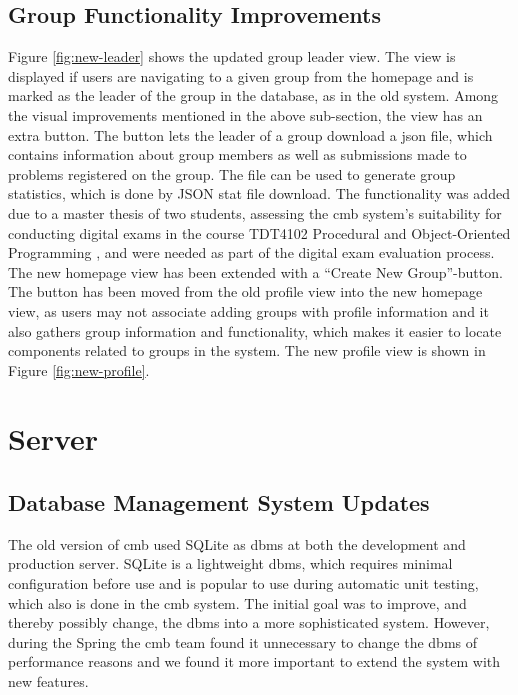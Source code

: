 \subsection{Group Functionality Improvements}
Figure \ref{fig:new-leader} shows the updated group leader view. The view is displayed if users are navigating to a given group from the homepage and is marked as the leader of the group in the database, as in the old system. Among the visual improvements mentioned in the above sub-section, the view has an extra button. The button lets the leader of a group download a \gls{json} file, which contains information about group members as well as submissions made to problems registered on the group. The file can be used to generate group statistics, which is done by
JSON stat file download. The functionality was added due to a master thesis of two students, assessing the \gls{cmb} system's suitability for conducting digital exams in the course TDT4102 Procedural and Object-Oriented Programming \cite{TDT4102}, and were needed as part of the digital exam evaluation process. \\

The new homepage view has been extended with a ``Create New Group''-button. The button has been moved from the old profile view into the new homepage view, as users may not associate adding groups with profile information and it also gathers group information and functionality, which makes it easier to locate components related to groups in the system. The new profile view is shown in Figure \ref{fig:new-profile}.

\section{Server}
\label{sec:impr-server}
\subsection{Database Management System Updates}
The old version of \gls{cmb} used SQLite \cite{SQLITE} as \gls{dbms} at both the development and production server. SQLite is a lightweight \gls{dbms}, which requires minimal configuration before use and is popular to use during automatic unit testing, which also is done in the \gls{cmb} system. The initial goal was to improve, and thereby possibly change, the \gls{dbms} into a more sophisticated system. However, during the Spring the \gls{cmb} team found it unnecessary to change the \gls{dbms} of performance reasons and we found it more important to extend the system with new features. \\

